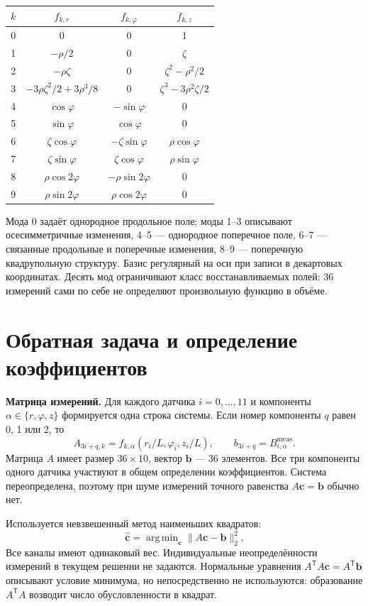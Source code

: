 \documentclass[a4paper,11pt]{article}
\DeclareMathOperator*{\argmin}{arg\,min}
\begin{document}
\begin{center}
\small
\begin{tabular}{c c c c}
\toprule
$k$ & $f_{k,r}$ & $f_{k,\varphi}$ & $f_{k,z}$ \\
\midrule
0 & $0$ & $0$ & $1$ \\
1 & $-\rho/2$ & $0$ & $\zeta$ \\
2 & $-\rho\zeta$ & $0$ & $\zeta^2-\rho^2/2$ \\
3 & $-3\rho\zeta^2/2+3\rho^3/8$ & $0$ & $\zeta^3-3\rho^2\zeta/2$ \\
4 & $\cos\varphi$ & $-\sin\varphi$ & $0$ \\
5 & $\sin\varphi$ & $\cos\varphi$ & $0$ \\
6 & $\zeta\cos\varphi$ & $-\zeta\sin\varphi$ & $\rho\cos\varphi$ \\
7 & $\zeta\sin\varphi$ & $\zeta\cos\varphi$ & $\rho\sin\varphi$ \\
8 & $\rho\cos2\varphi$ & $-\rho\sin2\varphi$ & $0$ \\
9 & $\rho\sin2\varphi$ & $\rho\cos2\varphi$ & $0$ \\
\bottomrule
\end{tabular}
\end{center}

Мода 0 задаёт однородное продольное поле; моды 1--3 описывают
осесимметричные изменения, 4--5 — однородное поперечное поле,
6--7 — связанные продольные и поперечные изменения, 8--9 — поперечную
квадрупольную структуру. Базис регулярный на оси при записи в декартовых
координатах. Десять мод ограничивают класс восстанавливаемых полей:
36 измерений сами по себе не определяют произвольную функцию в объёме.

\clearpage
\section{Обратная задача и определение коэффициентов}

\textbf{Матрица измерений.} Для каждого датчика $i=0,\ldots,11$
и компоненты $\alpha\in\{r,\varphi,z\}$ формируется одна строка системы.
Если номер компоненты $q$ равен 0, 1 или 2, то
\[
 A_{3i+q,k}=f_{k,\alpha}(r_i/L,\varphi_i,z_i/L),\qquad
 b_{3i+q}=B_{i,\alpha}^{\mathrm{meas}}.
\]
Матрица $A$ имеет размер $36\times10$, вектор $\mathbf b$ — 36 элементов.
Все три компоненты одного датчика участвуют в общем определении
коэффициентов. Система переопределена, поэтому при шуме измерений
точного равенства $A\mathbf c=\mathbf b$ обычно нет.

Используется невзвешенный метод наименьших квадратов:
\[
 \widehat{\mathbf c}=\argmin_{\mathbf c}
 \|A\mathbf c-\mathbf b\|_2^2.
\]
Все каналы имеют одинаковый вес. Индивидуальные неопределённости измерений
в текущем решении не задаются. Нормальные уравнения
$A^{\mathsf T}A\mathbf c=A^{\mathsf T}\mathbf b$ описывают условие минимума,
но непосредственно не используются: образование $A^{\mathsf T}A$
возводит число обусловленности в квадрат.
\end{document}
